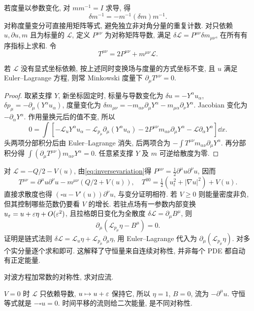 若度量以参数变化, 对 $mm^{-1}=I$ 求导, 得
\begin{equation}\label{eq:inversevariation}
\delta m^{-1}=-m^{-1}(\delta m)m^{-1}.
\end{equation}
对称度量变分可直接用矩阵等式, 避免独立非对角分量的重复计数.
对只依赖 $u,\partial u,m$ 且为标量的 $\mathcal L$, 定义 $P^{\mu\nu}$ 为对称矩阵导数, 满足 $\delta\mathcal L=P^{\mu\nu}\delta m_{\mu\nu}$, 在所有有序指标上求和. 令
\[
T^{\mu\nu}=2P^{\mu\nu}+m^{\mu\nu}\mathcal L.
\]
\begin{theorem}\label{thm:stressvariation}
若 $\mathcal L$ 没有显式坐标依赖, 按上述同时变换场与度量的方式坐标不变, 且 $u$ 满足 Euler--Lagrange 方程, 则常 Minkowski 度量下 $\partial_\mu T^{\mu\nu}=0$.
\end{theorem}
\begin{proof}
取紧支撑 $Y$, 新坐标固定时, 标量与导数变化为 $\delta u=-Y^\alpha u_\alpha$, $\delta p_\mu=-\partial_\mu(Y^\alpha u_\alpha)$, 度量变化为 $\delta m_{\mu\nu}=-m_{\alpha\nu}\partial_\mu Y^\alpha-m_{\mu\alpha}\partial_\nu Y^\alpha$. Jacobian 变化为 $-\partial_\alpha Y^\alpha$. 作用量换元后的值不变, 所以
\[
0=\int\left[-\mathcal L_uY^\alpha u_\alpha
-\mathcal L_{p_\mu}\partial_\mu(Y^\alpha u_\alpha)
-2P^{\mu\nu}m_{\alpha\nu}\partial_\mu Y^\alpha
-\mathcal L\partial_\alpha Y^\alpha\right]\dd x.
\]
头两项分部积分后由 Euler--Lagrange 消失, 后两项合为 $-\int T^{\mu\nu}m_{\alpha\nu}\partial_\mu Y^\alpha$. 再分部积分得 $\int(\partial_\mu T^{\mu\nu})m_{\alpha\nu}Y^\alpha=0$. 任意紧支撑 $Y$ 及 $m$ 可逆给散度为零.
\end{proof}
对 $\mathcal L=-Q/2-V(u)$, 由\eqref{eq:inversevariation}得 $P^{\mu\nu}=\tfrac12\partial^\mu u\partial^\nu u$, 因而
\[
T^{\mu\nu}=\partial^\mu u\partial^\nu u-m^{\mu\nu}(Q/2+V(u)),\quad
T^{00}=\tfrac12(u_t^2+|\nabla u|^2)+V(u).
\]
直接求散度也得 $(\square u-V'(u))\partial^\nu u$, 与变分证明相符. 若 $V\ge0$ 则能量密度非负, 但其控制哪些范数仍要看 $V$ 的增长.
若驻点场有一参数内部变换 $u_\varepsilon=u+\varepsilon\eta+O(\varepsilon^2)$, 且拉格朗日变化为全散度 $\delta\mathcal L=\partial_\mu B^\mu$, 则
\[
\partial_\mu(\mathcal L_{p_\mu}\eta-B^\mu)=0.
\]
证明是链式法则 $\delta\mathcal L=\mathcal L_u\eta+\mathcal L_{p_\mu}\partial_\mu\eta$, 用 Euler--Lagrange 代入为 $\partial_\mu(\mathcal L_{p_\mu}\eta)$. 对多个实分量逐个求和即可. 这解释了守恒量来自连续对称性, 并非每个 PDE 都自动有正定能量.
\begin{example}
对波方程加常数的对称性, 求对应流.
\end{example}
\begin{solution}
$V=0$ 时 $\mathcal L$ 只依赖导数, $u\mapsto u+\varepsilon$ 保持它, 所以 $\eta=1$, $B=0$, 流为 $-\partial^\mu u$. 守恒等式就是 $-\square u=0$. 时间平移的流则给二次能量, 是不同对称性.
\end{solution}
